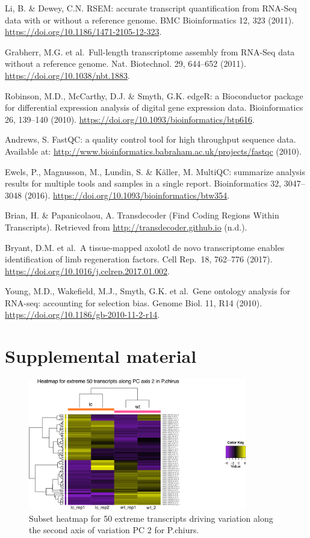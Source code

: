 \documentclass[12pt,]{article}
\begin{document}
Li, B. \& Dewey, C.N. RSEM: accurate transcript quantification from
RNA-Seq data with or without a reference genome. BMC Bioinformatics 12,
323 (2011). \url{https://doi.org/10.1186/1471-2105-12-323}.

Grabherr, M.G. et al.~Full-length transcriptome assembly from RNA-Seq
data without a reference genome. Nat. Biotechnol. 29, 644--652 (2011).
\url{https://doi.org/10.1038/nbt.1883}.

Robinson, M.D., McCarthy, D.J. \& Smyth, G.K. edgeR: a Bioconductor
package for differential expression analysis of digital gene expression
data. Bioinformatics 26, 139--140 (2010).
\url{https://doi.org/10.1093/bioinformatics/btp616}.

Andrews, S. FastQC: a quality control tool for high throughput sequence
data. Available at:
\url{http://www.bioinformatics.babraham.ac.uk/projects/fastqc} (2010).

Ewels, P., Magnusson, M., Lundin, S. \& Käller, M. MultiQC: summarize
analysis results for multiple tools and samples in a single report.
Bioinformatics 32, 3047--3048 (2016).
\url{https://doi.org/10.1093/bioinformatics/btw354}.

Brian, H. \& Papanicolaou, A. Transdecoder (Find Coding Regions Within
Transcripts). Retrieved from \url{http://transdecoder.github.io} (n.d.).

Bryant, D.M. et al.~A tissue-mapped axolotl de novo transcriptome
enables identification of limb regeneration factors. Cell Rep.~18,
762--776 (2017). \url{https://doi.org/10.1016/j.celrep.2017.01.002}.

Young, M.D., Wakefield, M.J., Smyth, G.K. et al.~Gene ontology analysis
for RNA-seq: accounting for selection bias. Genome Biol. 11, R14 (2010).
\url{https://doi.org/10.1186/gb-2010-11-2-r14}.

\section{Supplemental material}\label{supplemental-material}

\begin{figure}[htbp]
\centering
\includegraphics[width=0.85\textwidth]{output/figures/pc_and_xm_TMM_EXPR.minRow10.log2.centered.prcomp.extreme50.PC2.components.png}
\caption{Subset heatmap for 50 extreme transcripts driving variation along the second axis of variation PC 2 for P.chiurs. }
\end{figure}





\newpage
\singlespacing 

\end{document}
